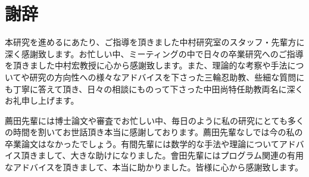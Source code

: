 \chapter{謝辞}

本研究を進めるにあたり、ご指導を頂きました中村研究室のスタッフ・先輩方に深く感謝致します。お忙しい中、ミーティングの中で日々の卒業研究へのご指導を頂きました中村宏教授に心から感謝致します。また、理論的な考察や手法についてや研究の方向性への様々なアドバイスを下さった三輪忍助教、些細な質問にも丁寧に答えて頂き、日々の相談にものって下さった中田尚特任助教両名に深くお礼申し上げます。

薦田先輩には博士論文や審査でお忙しい中、毎日のように私の研究にとても多くの時間を割いてお世話頂き本当に感謝しております。薦田先輩なしでは今の私の卒業論文はなかったでしょう。有間先輩には数学的な手法や理論についてアドバイス頂きまして、大きな助けになりました。會田先輩にはプログラム関連の有用なアドバイスを頂きまして、本当に助かりました。皆様に心から感謝致します。